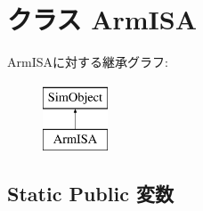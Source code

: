 \hypertarget{classArmISA_1_1ArmISA}{
\section{クラス ArmISA}
\label{classArmISA_1_1ArmISA}
}
ArmISAに対する継承グラフ:\begin{figure}[H]
\begin{center}
\leavevmode
\includegraphics[height=2cm]{classArmISA_1_1ArmISA}
\end{center}
\end{figure}
\subsection*{Static Public 変数}
